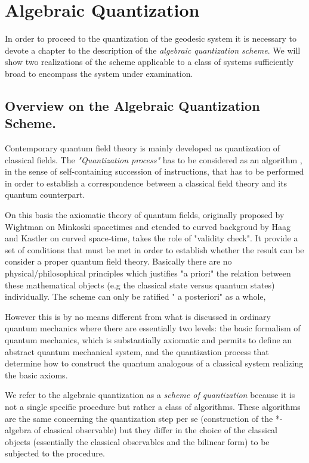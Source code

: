 \documentclass[Main]{subfiles}
\begin{document}
\chapter{Algebraic Quantization}
In order to proceed to the quantization of the geodesic system  it is necessary to devote a chapter to the description of the \emph{algebraic quantization scheme}.
We will show two realizations of the scheme applicable to a class of systems sufficiently broad to encompass the system under examination.

\section{Overview on the Algebraic Quantization Scheme.}
Contemporary quantum field theory is mainly developed as quantization of classical fields.
The \emph{"Quantization process"} has to be considered as an algorithm , in the sense of self-containing succession of instructions, that has to be performed in order to establish a correspondence between a classical field theory and its quantum counterpart.

On this basis the axiomatic theory of quantum fields, originally proposed by Wightman on Minkoski spacetimes and etended to curved backgroud by Haag and Kastler on curved space-time, takes the role of "validity check". It provide a set of conditions that must be met in order to establish whether the result can be consider a proper quantum field theory.
Basically there are no physical/philosophical principles which justifies "a priori" the relation between these  mathematical objects (e.g the classical state versus quantum states) individually. The scheme can only be ratified " a posteriori" as a whole,%

However this is by no means different from what is discussed in ordinary quantum mechanics where there are essentially two levels:
the basic formalism of quantum mechanics, which is substantially axiomatic and permits to define an abstract quantum mechanical system, and the quantization process that determine how to construct the quantum analogous of a classical system realizing the basic axioms.

We refer to the algebraic quantization as a \emph{scheme of quantization} because it is not a single specific procedure but rather a class of algorithms.
These algorithms are the same concerning the quantization step per se (construction of the *-algebra of classical observable) but they differ in the choice of the classical objects  (essentially the classical observables and the bilinear form) to be subjected to the procedure.
\end{document}
